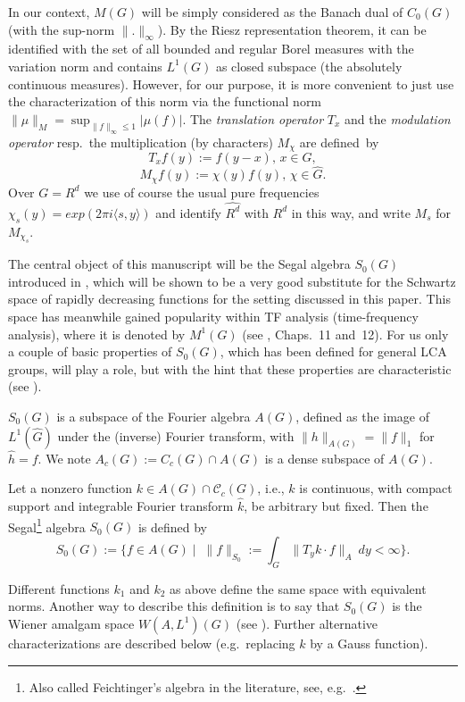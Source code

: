 \documentclass[graybox]{svmult}
\begin{document}
 In our context, $M(G)$ will be simply considered as the Banach dual
of $C_{0}(G)$ (with the sup-norm $\| . \| _{\infty }$).
By the Riesz representation
theorem, it can be identified with the set of all bounded and
regular Borel measures with the variation norm and contains
$L^1(G)$ as closed subspace (the absolutely continuous measures).
However, for our purpose, it is more convenient to just use the
characterization of this norm via the functional norm
$ \|\mu\|_M = \sup_{\|f\|_{\infty} \leq 1} |\mu(f)|$.
The \textit{translation operator} $T_{x}$ and the
\textit{modulation operator} resp.\ the multiplication (by characters) $M_{\chi}$ are defined~by
\[
T_{x}f(y) := f(y-x), \, x \in G,
\]
\[
M_{\chi}f(y) := \chi(y)f(y), \, \chi \in \hat{G}.
\]
Over $G = R^d$ we use of course the usual pure frequencies
$\chi_s(y) = exp( 2 \pi i \langle s, y \rangle)$ and identify
$\widehat{R^d}$ with $R^d$ in this way, and write $M_s$ for
$M_{\chi_s}$.


The central object of this manuscript will be the Segal
algebra ${S_{0}(G)}$ introduced in \cite{fe81-2},
 which will be shown to be a very good substitute for the
 Schwartz space of rapidly decreasing functions for the
 setting discussed in this paper. This space has
 meanwhile gained popularity within TF analysis
 (time-frequency analysis), where it is denoted by
 $M^1(G)$ (see \cite{gr01}, Chaps.~11 and~12).
For us only a couple of basic properties of ${S_{0}(G)}$,
which has been defined for general LCA groups, will
play a role, but with the hint that these properties
are characteristic (see \cite{lo83-1}).

$S_{0}(G)$ is a subspace of the Fourier algebra $A(G)$,
defined as the image of $L^1(\hat{G})$ under the (inverse)
Fourier transform, with $\|h\|_{A(G)} = \|f\|_1$
for $ \hat{h} = f$.
We note $A_c(G) := C_c(G) \cap A(G)$
 is a dense subspace of $A(G)$.


\begin{defin}
Let  a nonzero function $k\in A(G)\cap \mathcal{C}_c(G)$, i.e.,
$k$ is continuous, with compact support and integrable
Fourier transform $\hat k$,  be arbitrary but fixed.
Then the Segal\footnote{Also called
Feichtinger's algebra in the literature, see, e.g.\
 \cite{rest00}.}
 algebra  ${S_{0}(G)}$ is defined by
\[
{S_{0}(G)}:=\{f \in A(G)\mid \; \| f\| _{S_0}:= \int_G \| T_y k\cdot f\|_A\:dy <
\infty \}.
\]
\end{defin}

Different functions $k_1$ and $k_2$ as above define the
same space with equivalent norms. Another way to describe
this definition is to say that ${S_{0}(G)}$ is the Wiener amalgam
space $W(A,L^1)(G)$ (see \cite{fe83}). Further alternative
characterizations are described below (e.g.\ replacing $k$
by a Gauss function).
\end{document}
